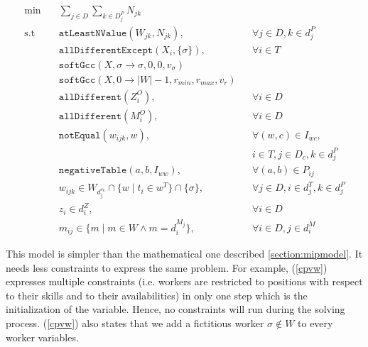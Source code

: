 \documentclass[../../thesis.tex]{subfiles}
\begin{document}
\begin{align}
  \textrm{min} \quad & \sum_{j \in D} \sum_{k \in D^P_j} N_{jk} & \label{cpobj} \\ 
  \textrm{s.t} \quad & \texttt{atLeastNValue}(W_{jk}, N_{jk}), && \forall j \in D, k \in d^P_j \label{cpobjctr} \\
                     & \texttt{allDifferentExcept}(X_i, \{ \sigma \}), && \forall i \in T \label{cpw1} \\
                     & \texttt{softGcc}(X, \sigma \rightarrow \sigma, 0, 0, v_{\sigma}) && \\
                     & \texttt{softGcc}(X, 0 \rightarrow |W| -1, r_{min}, r_{max}, v_{r}) &&\\
                     & \texttt{allDifferent}(Z^O_i), && \forall i \in D \label{cpz1} \\
                     & \texttt{allDifferent}(M^O_i), && \forall i \in D \label{cpm1} \\ 
                     & \texttt{notEqual}(w_{ijk}, w), && \forall (w, c) \in I_{wc}, \label{cpw2} \\ 
                     & && i \in T, j \in D_c, k \in d^P_j \nonumber \\ 
                     & \texttt{negativeTable}(a, b, I_{ww}), && \forall (a, b) \in P_{ij} \label{cpw3} \\ 
                     & w_{ijk} \in W_{d^{s_k}_j} \cap \{ w \mid t_i \in w^T \} \cap \{ \sigma \}, && \forall j \in D, i \in d^T_j, k \in d^P_j \label{cpvw} \\ 
                     & z_{i} \in d_i^Z, && \forall i \in D \label{cpvz} \\ 
                     & m_{ij} \in \{ m \mid m \in W \land m = d^{M_j}_i \}, && \forall i \in D, j \in d^M_i \label{cpvm}
\end{align}


This model is simpler than the mathematical one described \autoref{section:mipmodel}. It 
needs less constraints to express the same problem. For example, (\ref{cpvw}) expresses multiple constraints (i.e. workers are restricted to positions with respect to their skills and to their availabilities)
in only one step which is the initialization of the variable. Hence, no constraints will run during the solving process. (\ref{cpvw}) also states that we add a 
fictitious worker $\sigma \notin W$ to every worker variables.
\end{document}
